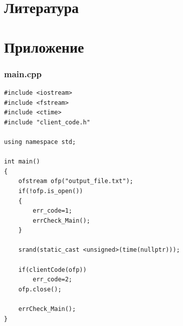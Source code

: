 \documentclass[a4paper,14pt]{article}
\begin{document}
\section{Литература}

\printbibliography

\clearpage

\section{Приложение}
\subsubsection{main.cpp}
\begin{verbatim}
#include <iostream>
#include <fstream>
#include <ctime>
#include "client_code.h"

using namespace std;

int main()
{
    ofstream ofp("output_file.txt");
    if(!ofp.is_open())
    {
        err_code=1;
        errCheck_Main();
    }

    srand(static_cast <unsigned>(time(nullptr)));

    if(clientCode(ofp))
        err_code=2;
    ofp.close();

    errCheck_Main();
}

\end{verbatim}
\end{document}
